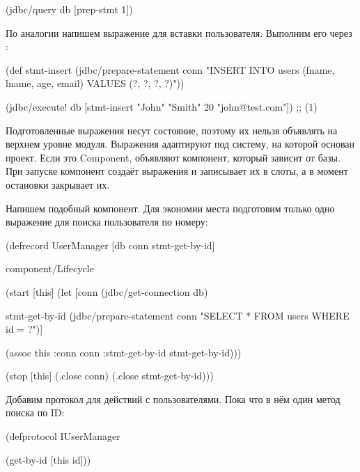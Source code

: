 \begin{english}
  \begin{clojure}
(jdbc/query db [prep-stmt 1])
  \end{clojure}
\end{english}

По аналогии напишем выражение для вставки пользователя. Выполним его через :

\begin{english}
  \begin{clojure}
(def stmt-insert
  (jdbc/prepare-statement conn
    "INSERT INTO users (fname, lname, age, email)
     VALUES (?, ?, ?, ?)"))

(jdbc/execute! db
  [stmt-insert "John" "Smith" 20 "john@test.com"])
;; (1)
  \end{clojure}
\end{english}


Подготовленные выражения несут состояние, поэтому их нельзя объявлять на верхнем уровне модуля. Выражения адаптируют под систему, на которой основан проект. Если это Component, объявляют компонент, который зависит от базы. При запуске компонент создаёт выражения и записывает их в слоты, а в момент остановки закрывает их.

Напишем подобный компонент. Для экономии места подготовим только одно выражение для поиска пользователя по номеру:

\begin{english}
  \begin{clojure}
(defrecord UserManager
    [db
     conn
     stmt-get-by-id]

  component/Lifecycle

  (start [this]
    (let [conn
          (jdbc/get-connection db)

          stmt-get-by-id
          (jdbc/prepare-statement conn
            "SELECT * FROM users WHERE id = ?")]

      (assoc this
             :conn conn
             :stmt-get-by-id stmt-get-by-id)))

  (stop [this]
    (.close conn)
    (.close stmt-get-by-id)))
  \end{clojure}
\end{english}

Добавим протокол для действий с пользователями. Пока что в нём один метод поиска по ID:

\begin{english}
  \begin{clojure}
(defprotocol IUserManager

  (get-by-id [this id]))
  \end{clojure}
\end{english}

